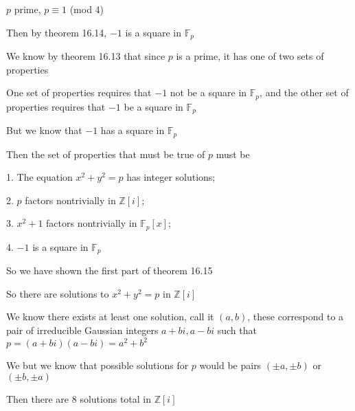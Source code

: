 \documentclass[12pt]{article}
\begin{document}
\begin{itemize}
$p$ prime, $p \equiv 1$ (mod 4)

Then by theorem 16.14, $-1$ is a square in $\mathbb{F}_p$

We know by theorem 16.13 that since $p$ is a prime, it has one of two sets of properties

One set of properties requires that $-1$ not be a square in $\mathbb{F}_p$, and the other set of properties requires that $-1$ be a square in $\mathbb{F}_p$

But we know that $-1$ has a square in $\mathbb{F}_p$ 

Then the set of properties that must be true of $p$ must be

1. The equation $x^2 + y^2 = p$ has integer solutions;

2. $p$ factors nontrivially in $\mathbb{Z}[i]$;

3. $x^2 + 1$ factors nontrivially in $\mathbb{F}_p[x]$;

4. $-1$ is a square in $\mathbb{F}_p$

So we have shown the first part of theorem 16.15

So there are solutions to $x^2 + y^2 = p$ in $\mathbb{Z}[i]$

We know there exists at least one solution, call it $(a,b)$, these correspond to a pair of irreducible Gaussian integers $a + bi, a- bi$ such that $p = (a+bi)(a-bi) = a^2 + b^2$

We but we know that possible solutions for $p$ would be pairs $(\pm a, \pm b)$ or $(\pm b, \pm a)$ 

Then there are 8 solutions total in $\mathbb{Z}[i]$

\end{itemize}
\end{document}

